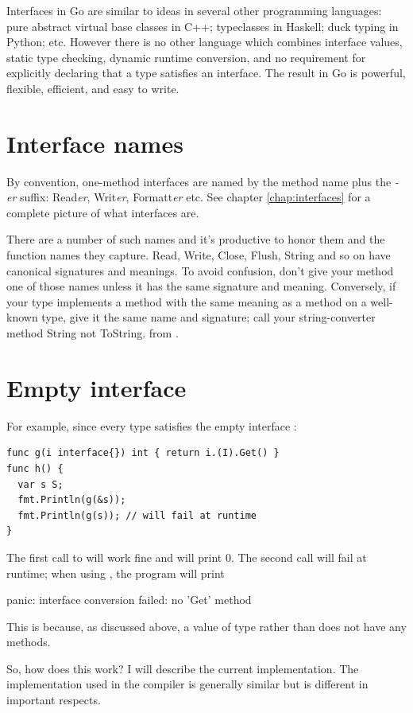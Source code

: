 Interfaces in Go are similar to ideas in several other programming languages:
pure abstract virtual base classes in C++; typeclasses in Haskell; duck typing
in Python; etc. However there is no other language which combines
interface values, static type checking, dynamic runtime conversion, and no
requirement for explicitly declaring that a type satisfies an interface. The
result in Go is powerful, flexible, efficient, and easy to write.

\section{Interface names}
By convention, one-method interfaces are named by the method name plus
the \emph{-er} suffix: Read\emph{er}, Writ\emph{er}, Formatt\emph{er} etc. See chapter
\ref{chap:interfaces} for a complete picture of what interfaces are.

There are a number of such names and it's productive to honor them and
the function names they capture. Read, Write, Close, Flush, String and
so on have canonical signatures and meanings. To avoid confusion, don't
give your method one of those names unless it has the same signature and
meaning. Conversely, if your type implements a method with the same
meaning as a method on a well-known type, give it the same name and
signature; call your string-converter method String not ToString.
from \cite{effective_go}.


\section{Empty interface}
For example, since every type satisfies the empty interface
:
\begin{lstlisting}
func g(i interface{}) int { return i.(I).Get() }
func h() {
  var s S;
  fmt.Println(g(&s));
  fmt.Println(g(s)); // will fail at runtime
}
\end{lstlisting}
The first call to  will work fine and will print 0. The second call will fail
at runtime; when using , the program will print
\begin{display}
panic: interface conversion failed: no 'Get' method
\end{display}
This is because, as discussed above, a value of type  rather than  
does not have any methods.

So, how does this work? I will describe the current  implementation. The
implementation used in the  compiler is generally similar but is different
in important respects.


